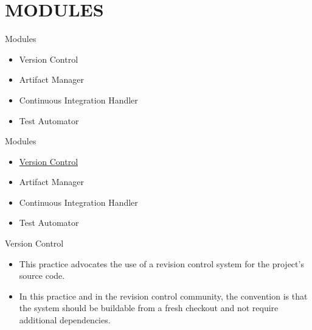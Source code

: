 \documentclass{beamer}
\begin{document}
\section{MODULES}
\begin{frame}{Modules}
\begin{itemize}
\item Version Control
\item Artifact Manager
\item Continuous Integration Handler
\item Test Automator

\end{itemize}

\end{frame}

\begin{frame}{Modules}
\begin{itemize}
\item \underline{Version Control}
\item Artifact Manager
\item Continuous Integration Handler
\item Test Automator

\end{itemize}

\end{frame}

\begin{frame}{Version Control}
\begin{itemize}
\item This practice advocates the use of a revision control system for the project’s source code.
\vspace{0.5 cm}
\item In this
practice and in the revision control community, the convention is that the system should
be buildable from a fresh checkout and not require additional dependencies.
\end{itemize}
\end{frame}
\end{document}
